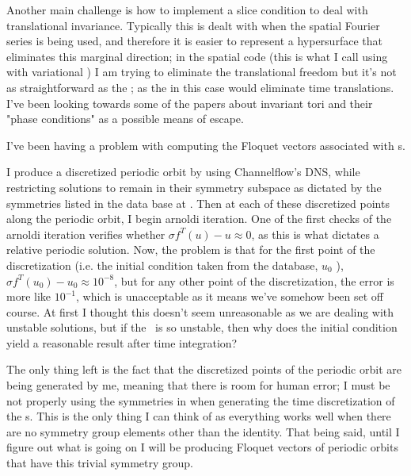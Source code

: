 \begin{description}
{\begin{description}
Another main challenge is how to implement a slice condition to deal with translational
invariance. Typically this is dealt with when the spatial Fourier series is being used, and
therefore it is easier to represent a hypersurface that eliminates this marginal direction; in
the spatial {\descent} code (this is what I call using  with variational {\descent}) I am trying to eliminate the translational freedom but it's not as straightforward as
the {\fFslice}; as the {\fFslice} in this case would eliminate time translations.
I've been looking towards some of the papers about invariant tori and their "phase conditions" as a
possible means of escape.


\item[Floquet vectors]
I've been having a problem with computing the Floquet vectors associated with {\rpo}s.

I produce a discretized periodic orbit by using Channelflow's DNS, while restricting solutions
to remain in their symmetry subspace as dictated by the symmetries listed in the data base at
. Then at each of these discretized points along the
periodic orbit, I begin arnoldi iteration. One of the first checks of the arnoldi iteration verifies
whether $\sigma f^T (u) - u \approx 0 $, as this is what dictates a relative periodic solution.
Now, the problem is that for the first point
of the discretization (i.e. the initial condition taken from the database, $u_0$ ),
$\sigma f^T(u_0) - u_0 \approx 10^{-8}$, but for any other point of the discretization, the error
is more like $10^{-1}$, which is unacceptable as it means we've somehow been set off course. At first
I thought this doesn't seem unreasonable as we are dealing with unstable solutions, but if the \rpo\ is
so unstable, then why does the initial condition yield a reasonable result after time integration?

The only thing left is the fact that the discretized points of the periodic orbit are being generated
by me, meaning that there is room for human error; I must be not properly using the symmetries in
when generating the time discretization of the {\rpo}s. This is the only thing I can think of as
everything works well when there are no symmetry group elements other than the identity. That being
said, until I figure out what is going on I will be producing Floquet vectors of periodic orbits that
have this trivial symmetry group.

\end{description}
}


\end{description}
